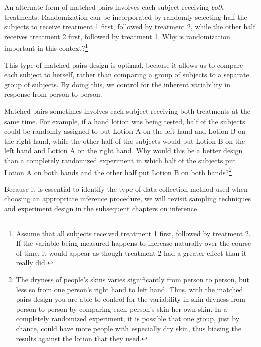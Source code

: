 {

An alternate form of matched pairs involves each subject receiving \emph{both} treatments. Randomization can be incorporated by randomly selecting half the subjects to receive treatment 1 first, followed by treatment 2, while the other half receives treatment 2 first, followed by treatment 1.  Why is randomization important in this context?\footnote{Assume that all subjects received treatment 1 first, followed by treatment 2.  If the variable being measured happens to increase naturally over the course of time, it would appear as though treatment 2 had a greater effect than it really did.}

This type of matched pairs design is optimal, because it allows us to compare each subject to herself, rather than comparing a group of subjects to a separate group of subjects.  By doing this, we control for the inherent variability in response from person to person.  

\begin{exercise}
Matched pairs sometimes involves each subject receiving both treatments at the same time.  For example, if a hand lotion was being tested, half of the subjects could be randomly assigned to put Lotion A on the left hand and Lotion B on the right hand, while the other half of the subjects would put Lotion B on the left hand and Lotion A on the right hand.  Why would this be a better design than a completely randomized experiment in which half of the subjects put Lotion A on both hands and the other half put Lotion B on both hands?\footnote{The dryness of people's skins varies significantly from person to person, but less so from one person's right hand to left hand.  Thus, with the matched pairs design you are able to control for the variability in skin dryness from person to person by comparing each person's skin her own skin.  In a completely randomized experiment, it is possible that one group, just by chance, could have more people with especially dry skin, thus biasing the results against the lotion that they used.}
\end{exercise}

Because it is essential to identify the type of data collection method used when choosing an appropriate inference procedure, we will revisit sampling techniques and experiment design in the subsequent chapters on inference.  
}

